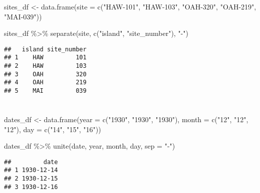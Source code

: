 \documentclass[
]{article}
\newenvironment{Shaded}{\begin{snugshade}}{\end{snugshade}}
\newcommand{\AttributeTok}[1]{\textcolor[rgb]{0.77,0.63,0.00}{#1}}
\newcommand{\FunctionTok}[1]{\textcolor[rgb]{0.00,0.00,0.00}{#1}}
\newcommand{\NormalTok}[1]{#1}
\newcommand{\OtherTok}[1]{\textcolor[rgb]{0.56,0.35,0.01}{#1}}
\newcommand{\SpecialCharTok}[1]{\textcolor[rgb]{0.00,0.00,0.00}{#1}}
\newcommand{\StringTok}[1]{\textcolor[rgb]{0.31,0.60,0.02}{#1}}
\begin{document}
\begin{Shaded}
\begin{Highlighting}[]
\NormalTok{sites\_df }\OtherTok{\textless{}{-}} \FunctionTok{data.frame}\NormalTok{(}\AttributeTok{site =} \FunctionTok{c}\NormalTok{(}\StringTok{"HAW{-}101"}\NormalTok{,}
                                \StringTok{"HAW{-}103"}\NormalTok{,}
                                \StringTok{"OAH{-}320"}\NormalTok{,}
                                \StringTok{"OAH{-}219"}\NormalTok{,}
                                \StringTok{"MAI{-}039"}\NormalTok{))}

\NormalTok{sites\_df }\SpecialCharTok{\%\textgreater{}\%} 
  \FunctionTok{separate}\NormalTok{(site, }\FunctionTok{c}\NormalTok{(}\StringTok{"island"}\NormalTok{, }\StringTok{"site\_number"}\NormalTok{), }\StringTok{"{-}"}\NormalTok{)}
\end{Highlighting}
\end{Shaded}

\begin{verbatim}
##   island site_number
## 1    HAW         101
## 2    HAW         103
## 3    OAH         320
## 4    OAH         219
## 5    MAI         039
\end{verbatim}

\hypertarget{section}{%
\section{}\label{section}}

\begin{Shaded}
\begin{Highlighting}[]
\NormalTok{dates\_df }\OtherTok{\textless{}{-}} \FunctionTok{data.frame}\NormalTok{(}\AttributeTok{year =} \FunctionTok{c}\NormalTok{(}\StringTok{"1930"}\NormalTok{,}
                                \StringTok{"1930"}\NormalTok{,}
                                \StringTok{"1930"}\NormalTok{),}
                       \AttributeTok{month =} \FunctionTok{c}\NormalTok{(}\StringTok{"12"}\NormalTok{,}
                                \StringTok{"12"}\NormalTok{,}
                                \StringTok{"12"}\NormalTok{),}
                       \AttributeTok{day =} \FunctionTok{c}\NormalTok{(}\StringTok{"14"}\NormalTok{,}
                               \StringTok{"15"}\NormalTok{,}
                               \StringTok{"16"}\NormalTok{))}

\NormalTok{dates\_df }\SpecialCharTok{\%\textgreater{}\%} 
  \FunctionTok{unite}\NormalTok{(date, year, month, day, }\AttributeTok{sep =} \StringTok{"{-}"}\NormalTok{)}
\end{Highlighting}
\end{Shaded}

\begin{verbatim}
##         date
## 1 1930-12-14
## 2 1930-12-15
## 3 1930-12-16
\end{verbatim}
\end{document}
